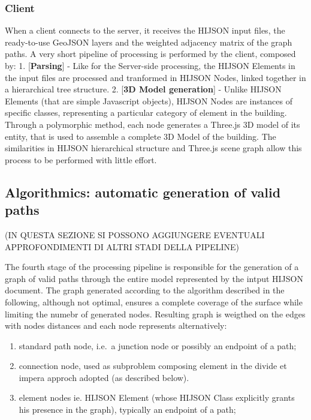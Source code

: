 \documentclass[]{article}
\begin{document}
\subsubsection{Client}\label{client}

When a client connects to the server, it receives the HIJSON input
files, the ready-to-use GeoJSON layers and the weighted adjacency matrix
of the graph paths. A very short pipeline of processing is performed by
the client, composed by: 1. {[}\textbf{Parsing}{]} - Like for the
Server-side processing, the HIJSON Elements in the input files are
processed and tranformed in HIJSON Nodes, linked together in a
hierarchical tree structure. 2. {[}\textbf{3D Model generation}{]} -
Unlike HIJSON Elements (that are simple Javascript objects), HIJSON
Nodes are instances of specific classes, representing a particular
category of element in the building. Through a polymorphic method, each
node generates a Three.js 3D model of its entity, that is used to
assemble a complete 3D Model of the building. The similarities in HIJSON
hierarchical structure and Three.js scene graph allow this process to be
performed with little effort.

\subsection{Algorithmics: automatic generation of valid
paths}\label{algorithmics-automatic-generation-of-valid-paths}

(IN QUESTA SEZIONE SI POSSONO AGGIUNGERE EVENTUALI APPROFONDIMENTI DI
ALTRI STADI DELLA PIPELINE)

The fourth stage of the processing pipeline is responsible for the
generation of a graph of valid paths through the entire model
represented by the intput HIJSON document. The graph generated according
to the algorithm described in the following, although not optimal,
ensures a complete coverage of the surface while limiting the numebr of
generated nodes. Resulting graph is weigthed on the edges with nodes
distances and each node represents alternatively:

\begin{enumerate}
\def\labelenumi{\alph{enumi}.}
\itemsep1pt\parskip0pt
\item
  standard path node, i.e.~a junction node or possibly an endpoint of a
  path;
\item
  connection node, used as subproblem composing element in the divide et
  impera approch adopted (as described below).
\item
  element nodes ie. HIJSON Element (whose HIJSON Class explicitly grants
  his presence in the graph), typically an endpoint of a path;
\end{enumerate}
\end{document}

